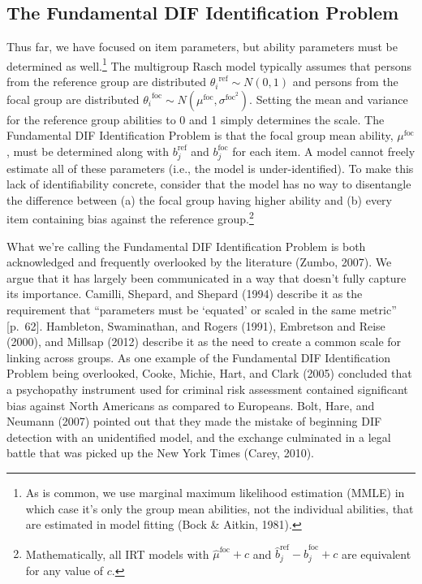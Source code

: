 \documentclass[
  english,
  man,floatsintext]{apa6}
\begin{document}
\hypertarget{the-fundamental-dif-identification-problem}{%
\subsection{The Fundamental DIF Identification Problem}\label{the-fundamental-dif-identification-problem}}

Thus far, we have focused on item parameters, but ability parameters must be determined as well.\footnote{As is common, we use marginal maximum likelihood estimation (MMLE) in which case it's only the group mean abilities, not the individual abilities, that are estimated in model fitting (Bock \& Aitkin, 1981).} The multigroup Rasch model typically assumes that persons from the reference group are distributed \({\theta_i}^{\text{ref}} \sim N(0,1)\) and persons from the focal group are distributed \({\theta_i}^{\text{foc}} \sim N(\mu^{\text{foc}}, \sigma^{\text{foc}^2})\). Setting the mean and variance for the reference group abilities to 0 and 1 simply determines the scale. The Fundamental DIF Identification Problem is that the focal group mean ability, \(\mu^{\text{foc}}\), must be determined along with \(b_j^{\text{ref}}\) and \(b_j^{\text{foc}}\) for each item. A model cannot freely estimate all of these parameters (i.e., the model is under-identified). To make this lack of identifiability concrete, consider that the model has no way to disentangle the difference between (a) the focal group having higher ability and (b) every item containing bias against the reference group.\footnote{Mathematically, all IRT models with \(\hat\mu^{\text{foc}} + c\) and \(\hat b_j^{\text{ref}} - \hat b_j^{\text{foc}} + c\) are equivalent for any value of \(c\).}

What we're calling the Fundamental DIF Identification Problem is both acknowledged and frequently overlooked by the literature (Zumbo, 2007). We argue that it has largely been communicated in a way that doesn't fully capture its importance. Camilli, Shepard, and Shepard (1994) describe it as the requirement that ``parameters must be `equated' or scaled in the same metric'' {[}p.~62{]}. Hambleton, Swaminathan, and Rogers (1991), Embretson and Reise (2000), and Millsap (2012) describe it as the need to create a common scale for linking across groups. As one example of the Fundamental DIF Identification Problem being overlooked, Cooke, Michie, Hart, and Clark (2005) concluded that a psychopathy instrument used for criminal risk assessment contained significant bias against North Americans as compared to Europeans. Bolt, Hare, and Neumann (2007) pointed out that they made the mistake of beginning DIF detection with an unidentified model, and the exchange culminated in a legal battle that was picked up the New York Times (Carey, 2010).
\end{document}
